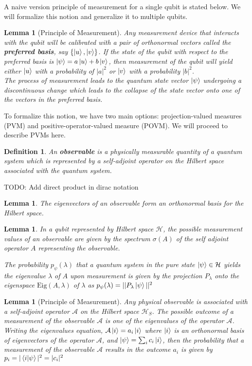 \documentclass[12pt,twoside]{report}
\theoremstyle{thmstyle}
\newtheorem{defn}[subsection]{Definition}
\newtheorem{lemma}[subsection]{Lemma}
\begin{document}
A naive version principle of measurement for a single qubit is stated below. We will formalize this notion and generalize it to multiple qubits.
\begin{lemma}[Principle of Measurement]
    Any measurement device that interacts with the qubit will be calibrated with a pair of orthonormal vectors called the \textbf{preferred basis}, say $\{ \ket{u}, \ket{v} \}$. If the state of the qubit with respect to the preferred basis is $\ket{\psi} = a \ket{u} + b \ket{v}$, then measurement of the qubit will yield either $\ket{u}$ with a probability of $|a|^2$ or $\ket{v}$ with a probability $|b|^2$. \\
The process of measurement leads to the quantum state vector $\ket{\psi}$ undergoing a discontinuous change which leads to the collapse of the state vector onto one of the vectors in the preferred basis.
\end{lemma}

To formalize this notion, we have two main options: projection-valued measures (PVM) and positive-operator-valued measure (POVM). We will proceed to describe PVMs here.

\begin{defn}
    An \textbf{observable} is a physically measurable quantity of a quantum system which is represented by a self-adjoint operator on the Hilbert space associated with the quantum system.
\end{defn}

TODO: Add direct product in dirac notation


\begin{lemma}
    The eigenvectors of an observable form an orthonormal basis for the Hilbert space.
\end{lemma}

\begin{lemma}
    In a qubit represented by Hilbert space $\mathcal{H}$, the possible measurement values of an observable are given by the spectrum $\sigma(A)$ of the self adjoint operator $A$ representing the observable.

    The probability $p_\psi(\lambda)$ that a quantum system in the pure state $\ket{\psi} \in \mathcal{H}$ yields the eigenvalue $\lambda$ of $A$ upon measurement is given by the projection $P_\lambda$ onto the eigenspace $\text{Eig}(A, \lambda)$ of $\lambda$ as $p_\psi(\lambda) = || P_\lambda \ket{\psi} ||^2$
\end{lemma}

\begin{lemma}[Principle of Measurement]
Any physical observable is associated with a self-adjoint operator $\mathcal{A}$ on the Hilbert space $\mathcal{H}_S$. The possible outcome of a measurement of the observable $\mathcal{A}$ is one of the eigenvalues of the operator $\mathcal{A}$. \\
Writing the eigenvalues equation, $\mathcal{A} \ket{i} = a_i \ket{i}$ where $\ket{i}$ is an orthonormal basis of eigenvectors of the operator $\mathcal{A}$, and  $\ket{\psi} = \sum_i c_i \ket{i}$,  then the probability that a measurement of the observable $\mathcal{A}$ results in the outcome $a_i$ is given by $p_i = |\braket{i|\psi}|^2 = |c_i|^2$
\end{lemma}
\end{document}
